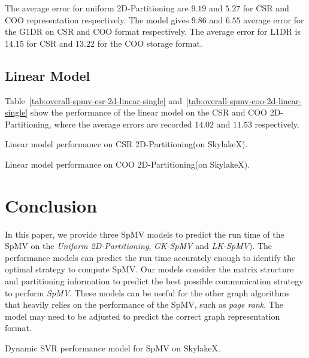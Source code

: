 \documentclass[sigconf,review,anonymous]{acmart}
\begin{document}
The average error for uniform 2D-Partitioning are $9.19$ and $5.27$ for
CSR and COO representation respectively.  The model gives $9.86$ and
$6.55$ average error for the G1DR on CSR and COO format
respectively. The average error for L1DR is $14.15$ for CSR and $13.22$
for the COO storage format.

\subsection{Linear Model}
Table~\ref{tab:overall-spmv-csr-2d-linear-single} and~\ref{tab:overall-spmv-coo-2d-linear-single} show the performance of the 
linear model on the CSR and COO 2D-Partitioning, where the average errors are recorded $14.02$ and $11.53$ respectively. 
\begin{table}[htb]
\caption{Linear model performance on CSR 2D-Partitioning(on SkylakeX).}
\label{tab:overall-spmv-csr-2d-linear-single}
\let\center\empty
\let\endcenter\relax
\centering
\resizebox{.8\width}{!}{}
\end{table}

\begin{table}[htb]
\caption{Linear model performance on COO 2D-Partitioning(on SkylakeX).}
\label{tab:overall-spmv-coo-2d-linear-single}
\let\center\empty
\let\endcenter\relax
\centering
\resizebox{.8\width}{!}{}
\end{table}

\section{Conclusion}
In this paper, we provide three SpMV models to predict the run time of the
SpMV on the \textit{Uniform 2D-Partitioning}, \textit{GK-SpMV} and \textit{LK-SpMV}). 
The performance models can predict the run time accurately enough to identify the
optimal strategy to compute SpMV. Our models consider the matrix structure and partitioning information to 
predict the best possible communication strategy to perform
\textit{SpMV}. These models can be useful for the other graph
algorithms that heavily relies on the performance of the SpMV, such as
\textit{page rank}. The model may need to be adjusted to predict the
correct graph representation format.

\begin{table}
 \caption{Dynamic SVR performance model for SpMV on SkylakeX.}
 \label{tab:dynamic-svr-spmv-performance}
\let\center\empty
\let\endcenter\relax
\centering
\resizebox{.99\width}{!}{}
\end{table}
\end{document}
